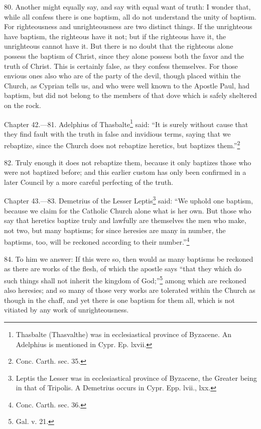 80. Another might equally say, and say with equal want of truth: I wonder that, while all confess there is one baptism, all do not understand the unity of baptism. For righteousness and unrighteousness are two distinct things. If the unrighteous have baptism, the righteous have it not; but if the righteous have it, the unrighteous cannot have it. But there is no doubt that the righteous alone possess the baptism of Christ, since they alone possess both the favor and the truth of Christ. This is certainly false, as they confess themselves. For those envious ones also who are of the party of the devil, though placed within the Church, as Cyprian tells us, and who were well known to the Apostle Paul, had baptism, but did not belong to the members of that dove which is safely sheltered on the rock.


Chapter 42.—81. Adelphius of Thasbalte\footnote{\par  Thasbalte (Thasvalthe) was in ecclesiastical province of Byzacene. An Adelphius is mentioned in Cypr. Ep. lxvii.} said: ``It is surely without cause that they find fault with the truth in false and invidious terms, saying that we rebaptize, since the Church does not rebaptize heretics, but baptizes them.''\footnote{\par  Conc. Carth. sec. 35.}

82. Truly enough it does not rebaptize them, because it only baptizes those who were not baptized before; and this earlier custom has only been confirmed in a later Council by a more careful perfecting of the truth.


Chapter 43.—83. Demetrius of the Lesser Leptis\footnote{\par  Leptis the Lesser was in ecclesiastical province of Byzacene, the Greater being in that of Tripolis. A Demetrius occurs in Cypr. Epp. lvii., lxx.} said: ``We uphold one baptism, because we claim for the Catholic Church alone what is her own. But those who say that heretics baptize truly and lawfully are themselves the men who make, not two, but many baptisms; for since heresies are many in number, the baptisms, too, will be reckoned according to their number.''\footnote{\par  Conc. Carth. sec. 36.}

84. To him we answer: If this were so, then would as many baptisms be reckoned as there are works of the flesh, of which the apostle says ``that they which do such things shall not inherit the kingdom of God;''\footnote{\par  Gal. v. 21.} among which are reckoned also heresies; and so many of those very works are tolerated within the Church as though in the chaff, and yet there is one baptism for them all, which is not vitiated by any work of unrighteousness.

